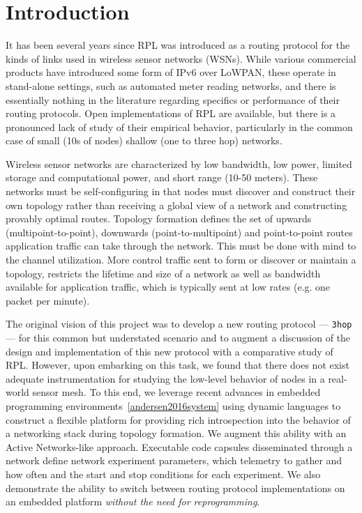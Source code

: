 \section{Introduction}

It has been several years since RPL was introduced as a routing protocol for the kinds of links used in wireless sensor networks (WSNs).
While various commercial products have introduced some form of IPv6 over LoWPAN, these operate in stand-alone settings, such as automated meter reading networks, and there is essentially nothing in the literature regarding specifics or performance of their routing protocols.
Open implementations of RPL are available, but there is a pronounced lack of study of their empirical behavior, particularly in the common case of small (10s of nodes) shallow (one to three hop) networks.

Wireless sensor networks are characterized by low bandwidth, low power, limited storage and computational power, and short range (10-50 meters).
These networks must be self-configuring in that nodes must discover and construct their own topology rather than receiving a global view of a network and constructing provably optimal routes.
Topology formation defines the set of upwards (multipoint-to-point), downwards (point-to-multipoint) and point-to-point routes application traffic can take through the network.
This must be done with mind to the channel utilization.
More control traffic sent to form or discover or maintain a topology, restricts the lifetime and size of a network as well as bandwidth available for application traffic, which is typically sent at low rates (e.g. one packet per minute).

The original vision of this project was to develop a new routing protocol --- \texttt{3hop} --- for this common but understated scenario and to augment a discussion of the design and implementation of this new protocol with a comparative study of RPL.
However, upon embarking on this task, we found that there does not exist adequate instrumentation for studying the low-level behavior of nodes in a real-world sensor mesh.
To this end, we leverage recent advances in embedded programming environments~\ref{andersen2016system} using dynamic languages to construct a flexible platform for providing rich introspection into the behavior of a networking stack during topology formation.
We augment this ability with an Active Networks-like approach.
Executable code capsules disseminated through a network define network experiment parameters, which telemetry to gather and how often and the start and stop conditions for each experiment.
We also demonstrate the ability to switch between routing protocol implementations on an embedded platform \emph{without the need for reprogramming}.

